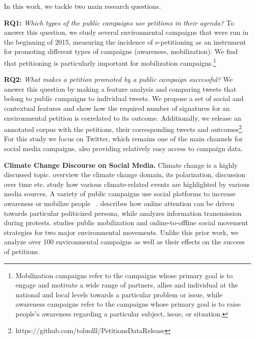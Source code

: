 In this work, we tackle two main research questions.

\textbf{RQ1:} \textit{Which types of the public campaigns use petitions in their agenda?}
To answer this question, we study several environmental campaigns that were run in the beginning of 2015, measuring the incidence of e-petitioning as an instrument for promoting different types of campaigns (awareness, mobilization). We find that petitioning is particularly important for mobilization campaigns.\footnote{Mobilization campaigns refer to the campaigns whose primary goal is to engage and motivate a wide range of partners, allies and individual at the national and local levels towards a particular problem or issue, while awareness campaigns refer to the campaigns whose primary goal is to raise people’s awareness regarding a particular subject, issue, or situation.}

\textbf{RQ2:} \textit{What makes a petition promoted by a public campaign successful?} We answer this question by making a feature analysis and comparing tweets that belong to public campaigns to individual tweets. 
%
We propose a set of social and contextual features and show how the required number of signatures for an environmental petition is correlated to its outcome.
Additionally, we release an annotated corpus with the petitions, their corresponding tweets and outcomes\footnote{https://github.com/toluolll/PetitionsDataRelease}.
For this study we focus on Twitter, which remains one of the main channels for social media campaigns, also providing relatively easy access to campaign data.

\textbf{Climate Change Discourse on Social Media.} Climate change is a highly discussed topic.
\citeauthor{Kirilenko2014}  overview the climate change domain, its polarization, discussion over time etc.
\citeauthor{Olteanu2015}  study how various climate-related events are highlighted by various media sources.
A variety of public campaigns use social platforms to increase awareness or mobilize people~\citeauthor{Mahmud2014} .
\citeauthor{Tufekci2013}  describes how online attention can be driven towards particular politicized persona, while \citeauthor{gonzalez2013networked}  analyzes information transmission during protests.
\citeauthor{hestres2013preaching}  studies public mobilization and online-to-offline social movement strategies for two major environmental movements.
Unlike this prior work, we analyze over 100 environmental campaigns as well as their effects on the success of petitions.

